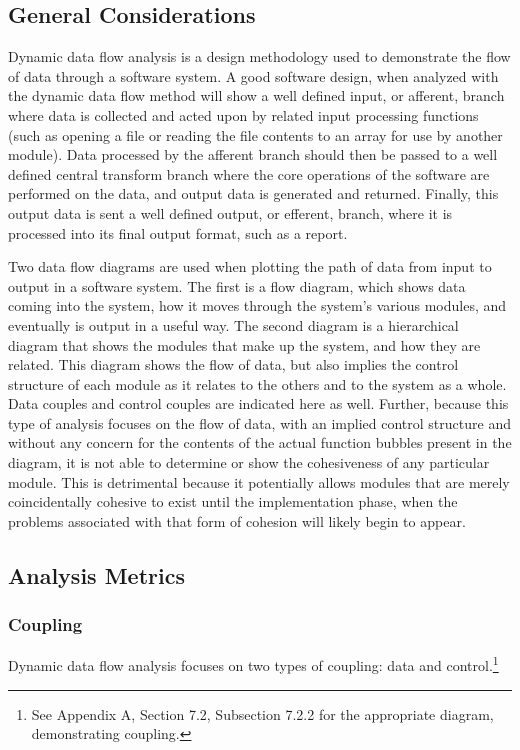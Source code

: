 \documentclass{article}
\begin{document}
	\subsection{General Considerations}
		Dynamic data flow analysis is a design methodology used to demonstrate the flow of data through a software system. A good software design, when analyzed with the dynamic data flow method will show a well defined input, or afferent, branch where data is collected and acted upon by related input processing functions (such as opening a file or reading the file contents to an array for use by another module). Data processed by the afferent branch should then be passed to a well defined central transform branch where the core operations of the software are performed on the data, and output data is generated and returned. Finally, this output data is sent a well defined output, or efferent, branch, where it is processed into its final output format, such as a report. 
	
		Two data flow diagrams are used when plotting the path of data from input to output in a software system. The first is a flow diagram, which shows data coming into the system, how it moves through the system's various modules, and eventually is output in a useful way. The second diagram is a hierarchical diagram that shows the modules that make up the system, and how they are related. This diagram shows the flow of data, but also implies the control structure of each module as it relates to the others and to the system as a whole. Data couples and control couples are indicated here as well. Further, because this type of analysis focuses on the flow of data, with an implied control structure and without any concern for the contents of the actual function bubbles present in the diagram, it is not able to determine or show the cohesiveness of any particular module. This is detrimental because it potentially allows modules that are merely coincidentally cohesive to exist until the implementation phase, when the problems associated with that form of cohesion will likely begin to appear. 
	\subsection{Analysis Metrics}
		\subsubsection{Coupling}
			Dynamic data flow analysis focuses on two types of coupling: data and control.\footnote{See Appendix A, Section 7.2, Subsection 7.2.2 for the appropriate diagram, demonstrating coupling.} 
\end{document}
